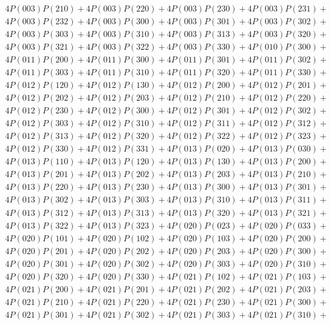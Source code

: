 \begin{align*}
	4P(003)P(210) + 4P(003)P(220) + 4P(003)P(230) + 4P(003)P(231)+ \\ 
	4P(003)P(232) + 4P(003)P(300) + 4P(003)P(301) + 4P(003)P(302)+ \\ 
	4P(003)P(303) + 4P(003)P(310) + 4P(003)P(313) + 4P(003)P(320)+ \\ 
	4P(003)P(321) + 4P(003)P(322) + 4P(003)P(330) + 4P(010)P(300)+ \\ 
	4P(011)P(200) + 4P(011)P(300) + 4P(011)P(301) + 4P(011)P(302)+ \\ 
	4P(011)P(303) + 4P(011)P(310) + 4P(011)P(320) + 4P(011)P(330)+ \\ 
	4P(012)P(120) + 4P(012)P(130) + 4P(012)P(200) + 4P(012)P(201)+ \\ 
	4P(012)P(202) + 4P(012)P(203) + 4P(012)P(210) + 4P(012)P(220)+ \\ 
	4P(012)P(230) + 4P(012)P(300) + 4P(012)P(301) + 4P(012)P(302)+ \\ 
	4P(012)P(303) + 4P(012)P(310) + 4P(012)P(311) + 4P(012)P(312)+ \\ 
	4P(012)P(313) + 4P(012)P(320) + 4P(012)P(322) + 4P(012)P(323)+ \\ 
	4P(012)P(330) + 4P(012)P(331) + 4P(013)P(020) + 4P(013)P(030)+ \\ 
	4P(013)P(110) + 4P(013)P(120) + 4P(013)P(130) + 4P(013)P(200)+ \\ 
	4P(013)P(201) + 4P(013)P(202) + 4P(013)P(203) + 4P(013)P(210)+ \\ 
	4P(013)P(220) + 4P(013)P(230) + 4P(013)P(300) + 4P(013)P(301)+ \\ 
	4P(013)P(302) + 4P(013)P(303) + 4P(013)P(310) + 4P(013)P(311)+ \\ 
	4P(013)P(312) + 4P(013)P(313) + 4P(013)P(320) + 4P(013)P(321)+ \\ 
	4P(013)P(322) + 4P(013)P(323) + 4P(020)P(023) + 4P(020)P(033)+ \\ 
	4P(020)P(101) + 4P(020)P(102) + 4P(020)P(103) + 4P(020)P(200)+ \\ 
	4P(020)P(201) + 4P(020)P(202) + 4P(020)P(203) + 4P(020)P(300)+ \\ 
	4P(020)P(301) + 4P(020)P(302) + 4P(020)P(303) + 4P(020)P(310)+ \\ 
	4P(020)P(320) + 4P(020)P(330) + 4P(021)P(102) + 4P(021)P(103)+ \\ 
	4P(021)P(200) + 4P(021)P(201) + 4P(021)P(202) + 4P(021)P(203)+ \\ 
	4P(021)P(210) + 4P(021)P(220) + 4P(021)P(230) + 4P(021)P(300)+ \\ 
	4P(021)P(301) + 4P(021)P(302) + 4P(021)P(303) + 4P(021)P(310)+ \\ 

\end{align*}

